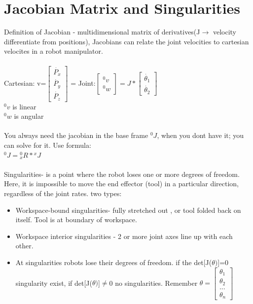 \documentclass{article}
\begin{document}
\section{Jacobian Matrix and Singularities}
Definition of Jacobian - multidimensional matrix of derivatives(J$\rightarrow$ velocity differentiate from positions), Jacobians can relate the joint velocities to cartesian velocites in a robot manipulator.  \\\\
Cartesian: v=$\begin{bmatrix}
   \dot{ P_x} \\
    \dot{P_y} \\
    \dot{P_z}
\end{bmatrix}$ = Joint:$\begin{bmatrix}
                          {}^0v\\
                          {}^0w
\end{bmatrix} = J * \begin{bmatrix}
\dot{\theta_1} \\
\dot{\theta_2}
\end{bmatrix}$\\
${}^0v$ is linear\\
${}^0w$ is angular\\\\
You always need the jacobian in the base frame ${}^0J$, when you dont have it; you can solve for it. Use formula:\\
${}^0J={}^0_xR * {}^xJ$\\\\
Singularities- is a point where the robot loses one or more degrees of freedom. Here, it is impossible to move the end effector (tool) in a particular direction, regardless of the joint rates. two types: \\
\begin{itemize}
    \item Workspace-bound singularities- fully stretched out , or tool folded back on itself. Tool is at boundary of workspace.
    \item Workspace interior singularities - 2 or more joint axes line up with each other.
    \item At singularities robots lose their degrees of freedom. if the det[J($\theta)$]=0 singularity exist, if det[J($\theta)$]$\neq$0 no singularities. Remember $\theta=\begin{bmatrix}
        \theta_1 \\
        \theta_2\\
        ...\\
        \theta_n
    \end{bmatrix}$
\end{itemize}
\end{document}
